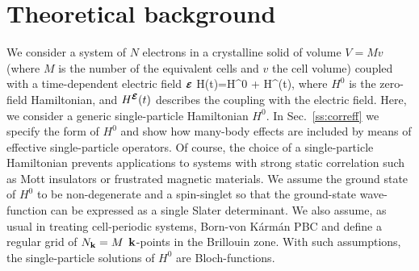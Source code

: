 \section{Theoretical background}\label{sc:theory}
We consider a system of $N$ electrons in a crystalline solid of volume $V=Mv$ (where $M$ is the number of the equivalent cells and $v$ the cell volume) coupled with a time-dependent electric field $\boldsymbol{\scriptstyle \cal E}$
\be
H(t)=H^0 + H^{\efield}(t), \label{eq:startH}
\ee
where $H^0$ is the zero-field Hamiltonian, and $H^{\boldsymbol{\scriptstyle \cal E}}(t)$ describes the coupling with the electric field. %
Here, we consider a generic single-particle Hamiltonian $H^0$. In Sec.~\ref{ss:correff} we specify the form of $H^0$ and show how many-body effects are included by means of effective single-particle operators. Of course, the choice of a single-particle Hamiltonian prevents applications to systems with strong static correlation such as Mott insulators or frustrated magnetic materials.
We assume the ground state of $H^0$ to be non-degenerate and a spin-singlet so that the ground-state wave-function can be expressed as a single Slater determinant. 
We also assume, as usual in treating cell-periodic systems, Born-von K\'arm\'an PBC and define a regular grid of  $N_{\bf k}=M$  ${\bf k}$-points in the Brillouin zone. With such assumptions, the single-particle solutions of $H^0$ are Bloch-functions.

